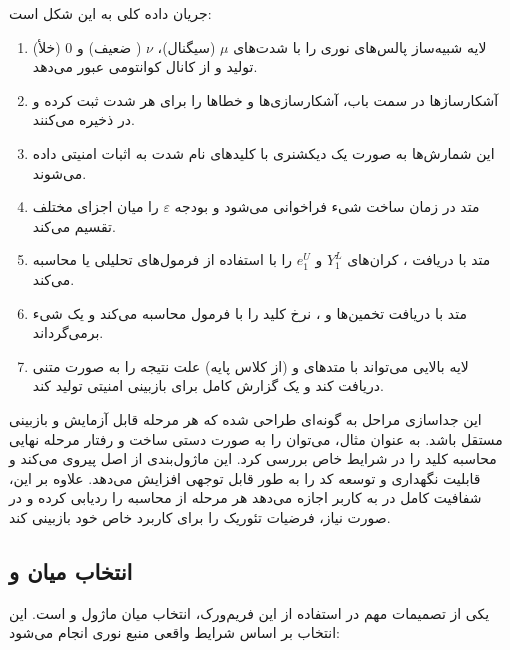 جریان داده کلی به این شکل است:
\begin{enumerate}
	\item لایه شبیه‌ساز پالس‌های نوری را با شدت‌های $\mu$ (سیگنال)، $\nu$ ( ضعیف) و 0 (خلأ) تولید و از کانال کوانتومی عبور می‌دهد.
	\item آشکارسازها در سمت باب، آشکارسازی‌ها و خطاها را برای هر شدت ثبت کرده و در  ذخیره می‌کنند.
	\item این شمارش‌ها به صورت یک دیکشنری  با کلیدهای نام شدت به اثبات امنیتی داده می‌شوند.
	\item متد  در زمان ساخت شیء فراخوانی می‌شود و بودجه $\varepsilon$ را میان اجزای مختلف تقسیم می‌کند.
	\item متد  با دریافت ، کران‌های $Y_1^L$ و $e_1^U$ را با استفاده از فرمول‌های تحلیلی یا  محاسبه می‌کند.
	\item متد  با دریافت تخمین‌ها و ، نرخ کلید را با فرمول  محاسبه می‌کند و یک شیء  برمی‌گرداند.
	\item لایه بالایی می‌تواند با متدهای  و  (از کلاس پایه) علت نتیجه را به صورت متنی دریافت کند و یک گزارش کامل برای بازبینی امنیتی تولید کند.
\end{enumerate}

این جداسازی مراحل به گونه‌ای طراحی شده که هر مرحله قابل آزمایش و بازبینی مستقل باشد. به عنوان مثال، می‌توان  را به صورت دستی ساخت و رفتار مرحله نهایی محاسبه کلید را در شرایط خاص بررسی کرد. این ماژول‌بندی از اصل  پیروی می‌کند و قابلیت نگهداری و توسعه کد را به طور قابل توجهی افزایش می‌دهد. علاوه بر این، شفافیت کامل در  به کاربر اجازه می‌دهد هر مرحله از محاسبه را ردیابی کرده و در صورت نیاز، فرضیات تئوریک را برای کاربرد خاص خود بازبینی کند.

\subsection{انتخاب میان  و }

یکی از تصمیمات مهم در استفاده از این فریم‌ورک، انتخاب میان ماژول  و  است. این انتخاب بر اساس شرایط واقعی منبع نوری انجام می‌شود:

